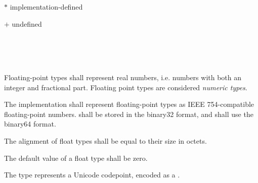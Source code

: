 $\ast$ implementation-defined

$+$ undefined


\begin{grammar}
 \\
	 \\
	 \\
\end{grammar}

\specsubsubitem
Floating-point types shall represent real numbers, i.e. numbers with both an
integer and fractional part. Floating point types are considered \textit{numeric
types}.

\specsubsubitem
The implementation shall represent floating-point types as IEEE 754-compatible
floating-point numbers.  shall be stored in the binary32 format,
and  shall use the binary64 format.

\specsubsubitem
The alignment of float types shall be equal to their size in octets.

\specsubsubitem
The default value of a float type shall be zero.


\specsubsubitem
The  type represents a Unicode codepoint, encoded as a
.


\begin{grammar}
 \\
	 \terminal{\{}  \terminal{\}} \\
	  \terminal{\{}  \terminal{\}} \\

 \\
	 \optional{\terminal{,}} \\
	 \terminal{,}  \\

 \\
	 \\
	 \terminal{=}  \\
\end{grammar}

